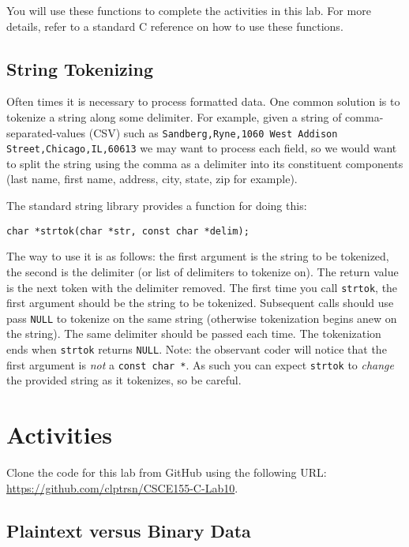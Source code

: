 \documentclass[12pt]{scrartcl}
\begin{document}
You will use these functions to complete the activities in this lab.  For 
more details, refer to a standard C reference on how to use these functions.

\subsection*{String Tokenizing}

Often times it is necessary to process formatted data.  One common 
solution is to tokenize a string along some delimiter.  For example, 
given a string of comma-separated-values (CSV) such as 
\texttt{Sandberg,Ryne,1060 West Addison Street,Chicago,IL,60613}
we may want to process each field, so we would want to split the string using 
the comma as a delimiter into its constituent components (last name, first name, 
address, city, state, zip for example).

The standard string library provides a function for doing this: 

\texttt{char *strtok(char *str, const char *delim);}

The way to use it is as follows: the first argument is the string to be tokenized, 
the second is the delimiter (or list of delimiters to tokenize on).  The return 
value is the next token with the delimiter removed.  The first time you call 
\texttt{strtok}, the first argument should be the string to be tokenized.  
Subsequent calls should use pass \texttt{NULL} to tokenize on the same 
string (otherwise tokenization begins anew on the string).  The same delimiter 
should be passed each time.  The tokenization ends when \texttt{strtok} 
returns \texttt{NULL}.  Note: the observant coder will notice that the first 
argument is \emph{not} a \texttt{const char *}.  As such you can expect 
\texttt{strtok} to \emph{change} the provided string as it tokenizes, so 
be careful.

\section{Activities}

Clone the code for this lab from GitHub using the following URL: 
\url{https://github.com/clptrsn/CSCE155-C-Lab10}.

\subsection{Plaintext versus Binary Data}
\end{document}
